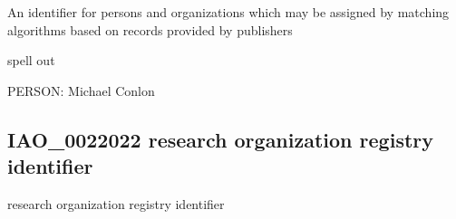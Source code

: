 \documentclass[letterpaper,10pt,english]{sphinxmanual}
\begin{document}
\begin{sphinxShadowBox}

\sphinxAtStartPar
{\hyperref[\detokenize{doc-IAO_0000578::doc}]{}}
\end{sphinxShadowBox}

\begin{sphinxShadowBox}

\sphinxAtStartPar
An identifier for persons and organizations which may be assigned by matching algorithms based on records provided by publishers
\end{sphinxShadowBox}

\begin{sphinxShadowBox}

\sphinxAtStartPar
{}
\end{sphinxShadowBox}

\begin{sphinxShadowBox}

\sphinxAtStartPar
spell out
\end{sphinxShadowBox}

\begin{sphinxShadowBox}

\sphinxAtStartPar
{}
\end{sphinxShadowBox}

\begin{sphinxShadowBox}

\sphinxAtStartPar
PERSON: Michael Conlon
\end{sphinxShadowBox}
\begin{quote}

\ignorespaces \end{quote}


\subsection{IAO\_0022022 \sphinxhyphen{} research organization registry identifier}
\label{\detokenize{doc-IAO_0022022:iao-0022022-research-organization-registry-identifier}}\label{\detokenize{doc-IAO_0022022:index-0}}\label{\detokenize{doc-IAO_0022022::doc}}
\begin{sphinxShadowBox}

\sphinxAtStartPar
research organization registry identifier
\end{sphinxShadowBox}
\end{document}
